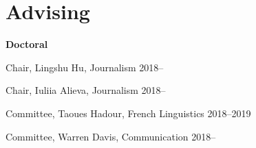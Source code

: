 
\section{Advising}

  \textbf{Doctoral}
    \begin{innerlist}
      \item Chair, Lingshu Hu, Journalism                                 \hfill 2018--
      \item Chair, Iuliia Alieva, Journalism                              \hfill 2018--
      \item Committee, Taoues Hadour, French Linguistics                  \hfill 2018--2019
      \item Committee, Warren Davis, Communication                        \hfill 2018--
    \end{innerlist}\vspace{1em}

